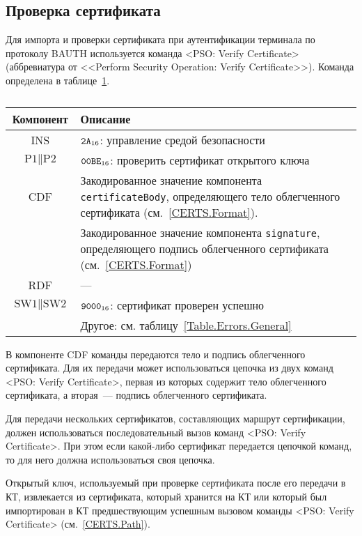 \subsection{Проверка сертификата}
\label{Oper.Descr.VerifyCert}

Для импорта и проверки сертификата при аутентификации терминала 
по протоколу BAUTH используется команда 
<PSO: Verify Certificate> (аббревиатура от <<Perform Security 
Operation: Verify Certificate>>).
Команда определена в таблице~\ref{Table.Oper.VerifyCertCmd}.

\begin{table}[hbt]
\caption{}\label{Table.Oper.VerifyCertCmd}
\begin{tabular}{|c|p{14cm}|}
\hline
Компонент & Описание\\ 
\hline
\hline
INS & $\texttt{2A}_{16}$: управление средой безопасности \\
\hline
$\text{P1} \parallel \text{P2}$ & $\texttt{00BE}_{16}$: проверить 
сертификат открытого ключа \\ 
\hline
CDF  & Закодированное значение компонента \verb|certificateBody|, определяющего тело 
облегченного сертификата (см.~\ref{CERTS.Format}).\\
 & Закодированное значение компонента \verb|signature|, определяющего подпись 
облегченного сертификата (см.~\ref{CERTS.Format})\\
\hline 
\hline
RDF &  --- \\
\hline
$\text{SW1} \parallel \text{SW2}$ & $\texttt{9000}_{16}$: сертификат проверен успешно \\
\cline{2-2}
 & Другое: см. таблицу~\ref{Table.Errors.General} \\
\hline
\end{tabular}
\end{table}

В компоненте CDF команды передаются тело и подпись облегченного сертификата.
Для их передачи может использоваться цепочка из двух команд 
<PSO: Verify Certificate>, первая из которых содержит тело 
облегченного сертификата, а вторая~--- подпись облегченного сертификата.

Для передачи нескольких сертификатов, составляющих маршрут 
сертификации, должен использоваться последовательный 
вызов команд <PSO: Verify Certificate>. 
При этом если какой-либо сертификат передается цепочкой команд, 
то для него должна использоваться своя цепочка.

Открытый ключ, используемый при проверке сертификата после его передачи в
КТ, извлекается из сертификата, который хранится на КТ или который был 
импортирован в КТ предшествующим успешным вызовом 
команды <PSO: Verify Certificate> (см.~\ref{CERTS.Path}).

